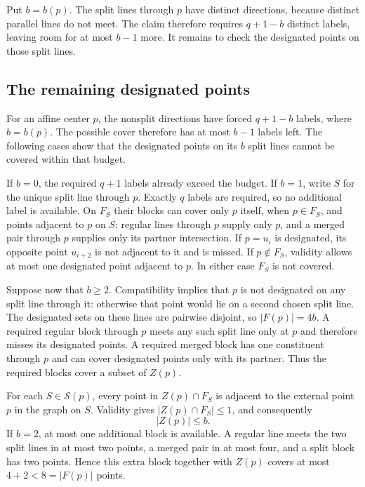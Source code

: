 Put $b=b(p)$.  The split lines through $p$ have distinct directions,
because distinct parallel lines do not meet.  The claim therefore
requires $q+1-b$ distinct labels, leaving room for at most $b-1$ more.
It remains to check the designated points on those split lines.

\subsection{The remaining designated points}

For an affine center $p$, the nonsplit directions have forced $q+1-b$
labels, where $b=b(p)$. The possible cover therefore has at most $b-1$
labels left. The following cases show that the designated points on its
$b$ split lines cannot be covered within that budget.

If $b=0$, the required $q+1$ labels already exceed the budget.  If $b=1$,
write $S$ for the unique split line through $p$.  Exactly $q$ labels are
required, so no additional label is available.  On $F_S$ their blocks
can cover only $p$ itself, when $p\in F_S$, and points adjacent to $p$
on $S$: regular lines through $p$ supply only $p$, and a merged pair
through $p$ supplies only its partner intersection.  If $p=u_i$ is
designated, its opposite point $u_{i+2}$ is not adjacent to it and is
missed.  If $p\notin F_S$, validity allows at most one designated point
adjacent to $p$.  In either case $F_S$ is not covered.

Suppose now that $b\geq2$.  Compatibility implies that $p$ is not
designated on any split line through it: otherwise that point would lie
on a second chosen split line.  The designated sets on these lines are
pairwise disjoint, so $|F(p)|=4b$.  A required regular block through $p$
meets any such split line only at $p$ and therefore misses its designated
points.  A required merged block has one constituent through $p$ and
can cover designated points only with its partner.  Thus the required
blocks cover a subset of $Z(p)$.

For each $S\in\mathcal S(p)$, every point in $Z(p)\cap F_S$ is adjacent
to the external point $p$ in the graph on $S$.  Validity gives
$|Z(p)\cap F_S|\leq1$, and consequently
\begin{equation}
 |Z(p)|\leq b.
 \label{eq:det-partner-count}
\end{equation}
If $b=2$, at most one additional block is available.  A regular line
meets the two split lines in at most two points, a merged pair in at most
four, and a split block has two points.  Hence this extra block together
with $Z(p)$ covers at most $4+2<8=|F(p)|$ points.

